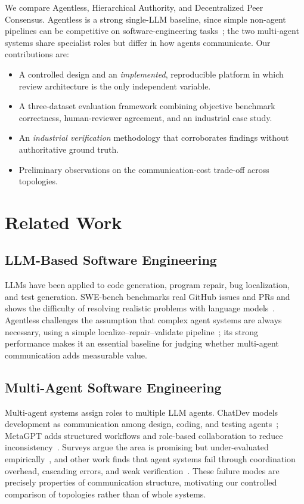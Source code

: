 \documentclass[conference]{IEEEtran}
\begin{document}
We compare Agentless, Hierarchical Authority, and Decentralized Peer Consensus.
Agentless is a strong single-LLM baseline, since simple non-agent pipelines can be
competitive on software-engineering tasks~\cite{agentless}; the two multi-agent
systems share specialist roles but differ in how agents communicate. Our
contributions are:
\begin{itemize}
  \item A controlled design and an \emph{implemented}, reproducible platform in
  which review architecture is the only independent variable.
  \item A three-dataset evaluation framework combining objective benchmark
  correctness, human-reviewer agreement, and an industrial case study.
  \item An \emph{industrial verification} methodology that corroborates findings
  without authoritative ground truth.
  \item Preliminary observations on the communication-cost trade-off across
  topologies.
\end{itemize}

\section{Related Work}
\subsection{LLM-Based Software Engineering}
LLMs have been applied to code generation, program repair, bug localization, and
test generation. SWE-bench benchmarks real GitHub issues and PRs and shows the
difficulty of resolving realistic problems with language models~\cite{swebench}.
Agentless challenges the assumption that complex agent systems are always
necessary, using a simple localize--repair--validate pipeline~\cite{agentless};
its strong performance makes it an essential baseline for judging whether
multi-agent communication adds measurable value.

\subsection{Multi-Agent Software Engineering}
Multi-agent systems assign roles to multiple LLM agents. ChatDev models
development as communication among design, coding, and testing
agents~\cite{chatdev}; MetaGPT adds structured workflows and role-based
collaboration to reduce inconsistency~\cite{metagpt}. Surveys argue the area is
promising but under-evaluated empirically~\cite{survey}, and other work finds that
agent systems fail through coordination overhead, cascading errors, and weak
verification~\cite{failures}. These failure modes are precisely properties of
communication structure, motivating our controlled comparison of topologies rather
than of whole systems.
\end{document}
